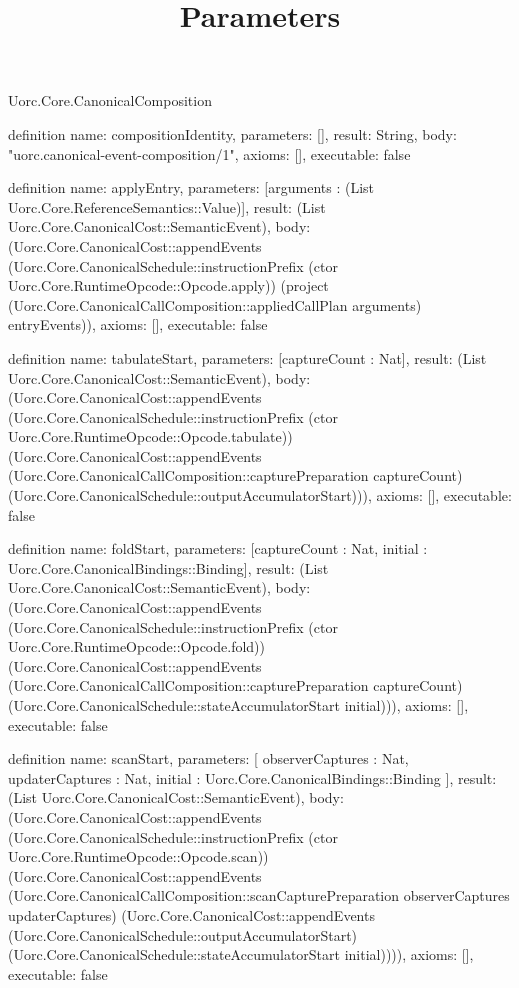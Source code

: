 \begin{lexlean}{Uorc.Core.CanonicalComposition}
\title{Parameters}
\begin{semanticmodule}
definition{
  name: compositionIdentity,
  parameters: [],
  result: String,
  body: "uorc.canonical-event-composition/1",
  axioms: [],
  executable: false
}

definition{
  name: applyEntry,
  parameters: [arguments : (List Uorc.Core.ReferenceSemantics::Value)],
  result: (List Uorc.Core.CanonicalCost::SemanticEvent),
  body: (Uorc.Core.CanonicalCost::appendEvents (Uorc.Core.CanonicalSchedule::instructionPrefix (ctor Uorc.Core.RuntimeOpcode::Opcode.apply)) (project (Uorc.Core.CanonicalCallComposition::appliedCallPlan arguments) entryEvents)),
  axioms: [],
  executable: false
}

definition{
  name: tabulateStart,
  parameters: [captureCount : Nat],
  result: (List Uorc.Core.CanonicalCost::SemanticEvent),
  body: (Uorc.Core.CanonicalCost::appendEvents (Uorc.Core.CanonicalSchedule::instructionPrefix (ctor Uorc.Core.RuntimeOpcode::Opcode.tabulate)) (Uorc.Core.CanonicalCost::appendEvents (Uorc.Core.CanonicalCallComposition::capturePreparation captureCount) (Uorc.Core.CanonicalSchedule::outputAccumulatorStart))),
  axioms: [],
  executable: false
}

definition{
  name: foldStart,
  parameters: [captureCount : Nat, initial : Uorc.Core.CanonicalBindings::Binding],
  result: (List Uorc.Core.CanonicalCost::SemanticEvent),
  body: (Uorc.Core.CanonicalCost::appendEvents (Uorc.Core.CanonicalSchedule::instructionPrefix (ctor Uorc.Core.RuntimeOpcode::Opcode.fold)) (Uorc.Core.CanonicalCost::appendEvents (Uorc.Core.CanonicalCallComposition::capturePreparation captureCount) (Uorc.Core.CanonicalSchedule::stateAccumulatorStart initial))),
  axioms: [],
  executable: false
}

definition{
  name: scanStart,
  parameters: [
    observerCaptures : Nat,
    updaterCaptures : Nat,
    initial : Uorc.Core.CanonicalBindings::Binding
  ],
  result: (List Uorc.Core.CanonicalCost::SemanticEvent),
  body: (Uorc.Core.CanonicalCost::appendEvents (Uorc.Core.CanonicalSchedule::instructionPrefix (ctor Uorc.Core.RuntimeOpcode::Opcode.scan)) (Uorc.Core.CanonicalCost::appendEvents (Uorc.Core.CanonicalCallComposition::scanCapturePreparation observerCaptures updaterCaptures) (Uorc.Core.CanonicalCost::appendEvents (Uorc.Core.CanonicalSchedule::outputAccumulatorStart) (Uorc.Core.CanonicalSchedule::stateAccumulatorStart initial)))),
  axioms: [],
  executable: false
}


\end{semanticmodule}
\end{lexlean}
